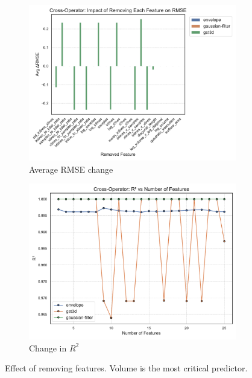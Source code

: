 \begin{figure}[htbp]
    \centering
    \begin{subfigure}[t]{0.49\textwidth}
        \includegraphics[width=\textwidth]{assets/images/05/feature_impact}
        \caption{Average RMSE change}
    \end{subfigure}
    \hfill
    \begin{subfigure}[t]{0.49\textwidth}
        \includegraphics[width=\textwidth]{assets/images/05/cross_feature_selection_r2}
        \caption{Change in $R^2$}
    \end{subfigure}
    \caption{Effect of removing features. Volume is the most critical predictor.}
    \label{fig:feature_selection_overview_part1}
\end{figure}

